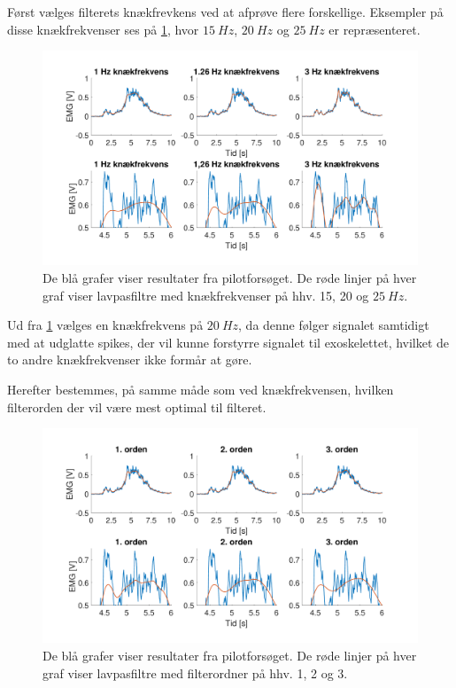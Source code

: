 Først vælges filterets knækfrevkens ved at afprøve flere forskellige. Eksempler på disse knækfrekvenser ses på \ref{fig:lp_knaek}, hvor $15~Hz$, $20~Hz$ og $25~Hz$ er repræsenteret. 

\begin{figure} [H]
\centering
\includegraphics[width=1\textwidth]{figures/problemloesning/lavpas_knaek}
\caption{De blå grafer viser resultater fra pilotforsøget. De røde linjer på hver graf viser lavpasfiltre med knækfrekvenser på hhv. 15, 20 og $25~Hz$.}
\label{fig:lp_knaek}
\end{figure} 

\noindent
Ud fra \ref{fig:lp_knaek} vælges en knækfrekvens på $20~Hz$, da denne følger signalet samtidigt med at udglatte spikes, der vil kunne forstyrre signalet til exoskelettet, hvilket de to andre knækfrekvenser ikke formår at gøre.

Herefter bestemmes, på samme måde som ved knækfrekvensen, hvilken filterorden der vil være mest optimal til filteret. 

\begin{figure} [H]
\centering
\includegraphics[width=1\textwidth]{figures/problemloesning/lavpas_orden}
\caption{De blå grafer viser resultater fra pilotforsøget. De røde linjer på hver graf viser lavpasfiltre med filterordner på hhv. 1, 2 og 3.}
\label{fig:lp_orden}
\end{figure} 

